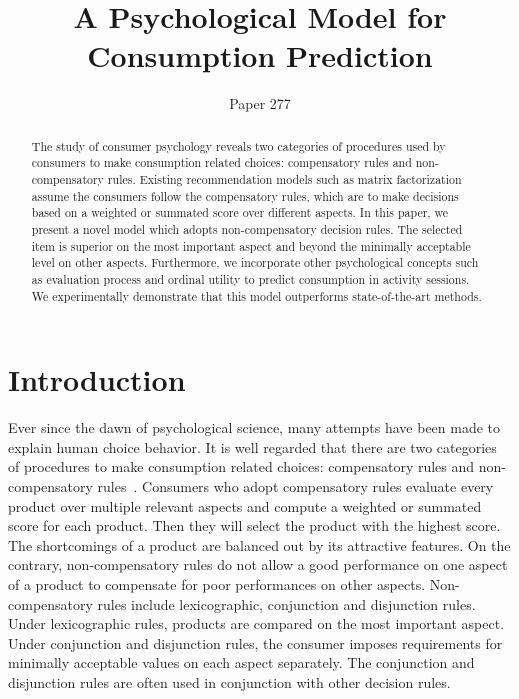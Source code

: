 \documentclass[sigconf]{acmart}
\begin{document}
\title{A Psychological Model for Consumption Prediction}


\author{Paper 277}


\begin{abstract}
The study of consumer psychology reveals two categories of procedures used by consumers to make consumption related choices: compensatory rules and non-compensatory rules. Existing recommendation models such as matrix factorization assume the consumers follow the compensatory rules, which are to make decisions based on a weighted or summated score over different aspects. In this paper, we present a novel model which adopts non-compensatory decision rules. The selected item is superior on the most important aspect and beyond the minimally acceptable level on other aspects. Furthermore, we incorporate other psychological concepts such as evaluation process and ordinal utility to predict consumption in activity sessions. We experimentally demonstrate that this model outperforms state-of-the-art methods.
\end{abstract}




\maketitle
\section{Introduction}\label{sec:introduction}


Ever since the dawn of psychological science, many attempts have been made to explain human choice behavior. It is well regarded that there are two categories of procedures to make consumption related choices: compensatory rules and non-compensatory rules~\cite{Engel1986Consumer}. Consumers who adopt compensatory rules evaluate every product over multiple relevant aspects and compute a weighted or summated score for each product. Then they will select the product with the highest score. The shortcomings of a product are balanced out by its attractive features. On the contrary, non-compensatory rules do not allow a good performance on one aspect of a product to compensate for poor performances on other aspects. Non-compensatory rules include lexicographic, conjunction and disjunction rules. Under lexicographic rules, products are compared on the most important aspect. Under conjunction and disjunction rules, the consumer imposes requirements for minimally acceptable values on each aspect separately. The conjunction and disjunction rules are often used in conjunction with other decision rules.
\end{document}
